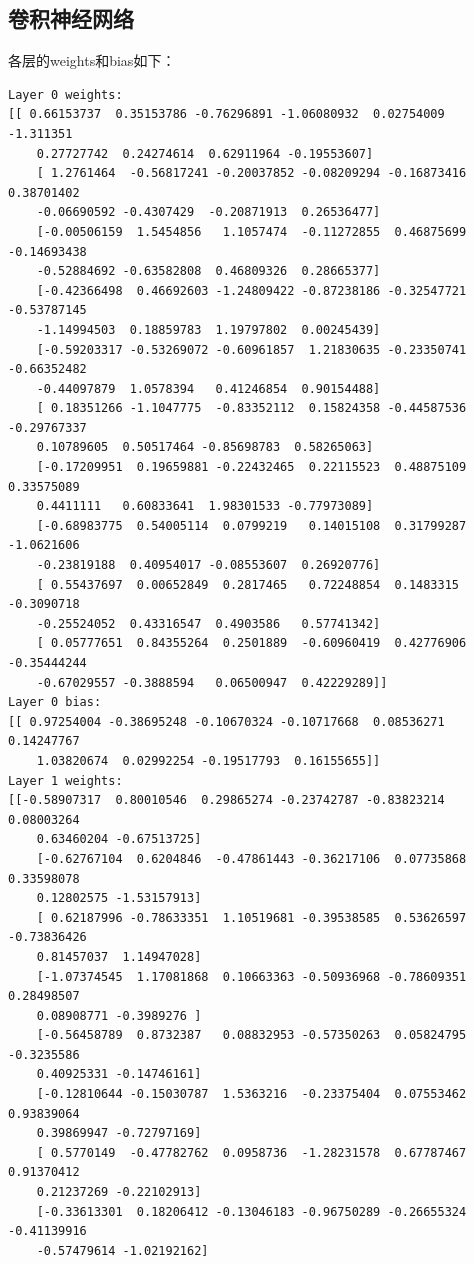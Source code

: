 \documentclass[UTF8]{article}
\begin{document}
    \subsection{卷积神经网络}
    各层的{\jetbrains weights}和{\jetbrains bias}如下：
    \begin{lstlisting}
Layer 0 weights:
[[ 0.66153737  0.35153786 -0.76296891 -1.06080932  0.02754009 -1.311351
    0.27727742  0.24274614  0.62911964 -0.19553607]
    [ 1.2761464  -0.56817241 -0.20037852 -0.08209294 -0.16873416  0.38701402
    -0.06690592 -0.4307429  -0.20871913  0.26536477]
    [-0.00506159  1.5454856   1.1057474  -0.11272855  0.46875699 -0.14693438
    -0.52884692 -0.63582808  0.46809326  0.28665377]
    [-0.42366498  0.46692603 -1.24809422 -0.87238186 -0.32547721 -0.53787145
    -1.14994503  0.18859783  1.19797802  0.00245439]
    [-0.59203317 -0.53269072 -0.60961857  1.21830635 -0.23350741 -0.66352482
    -0.44097879  1.0578394   0.41246854  0.90154488]
    [ 0.18351266 -1.1047775  -0.83352112  0.15824358 -0.44587536 -0.29767337
    0.10789605  0.50517464 -0.85698783  0.58265063]
    [-0.17209951  0.19659881 -0.22432465  0.22115523  0.48875109  0.33575089
    0.4411111   0.60833641  1.98301533 -0.77973089]
    [-0.68983775  0.54005114  0.0799219   0.14015108  0.31799287 -1.0621606
    -0.23819188  0.40954017 -0.08553607  0.26920776]
    [ 0.55437697  0.00652849  0.2817465   0.72248854  0.1483315  -0.3090718
    -0.25524052  0.43316547  0.4903586   0.57741342]
    [ 0.05777651  0.84355264  0.2501889  -0.60960419  0.42776906 -0.35444244
    -0.67029557 -0.3888594   0.06500947  0.42229289]]
Layer 0 bias:
[[ 0.97254004 -0.38695248 -0.10670324 -0.10717668  0.08536271  0.14247767
    1.03820674  0.02992254 -0.19517793  0.16155655]]
Layer 1 weights:
[[-0.58907317  0.80010546  0.29865274 -0.23742787 -0.83823214  0.08003264
    0.63460204 -0.67513725]
    [-0.62767104  0.6204846  -0.47861443 -0.36217106  0.07735868  0.33598078
    0.12802575 -1.53157913]
    [ 0.62187996 -0.78633351  1.10519681 -0.39538585  0.53626597 -0.73836426
    0.81457037  1.14947028]
    [-1.07374545  1.17081868  0.10663363 -0.50936968 -0.78609351  0.28498507
    0.08908771 -0.3989276 ]
    [-0.56458789  0.8732387   0.08832953 -0.57350263  0.05824795 -0.3235586
    0.40925331 -0.14746161]
    [-0.12810644 -0.15030787  1.5363216  -0.23375404  0.07553462  0.93839064
    0.39869947 -0.72797169]
    [ 0.5770149  -0.47782762  0.0958736  -1.28231578  0.67787467  0.91370412
    0.21237269 -0.22102913]
    [-0.33613301  0.18206412 -0.13046183 -0.96750289 -0.26655324 -0.41139916
    -0.57479614 -1.02192162]

\end{lstlisting}
\end{document}
